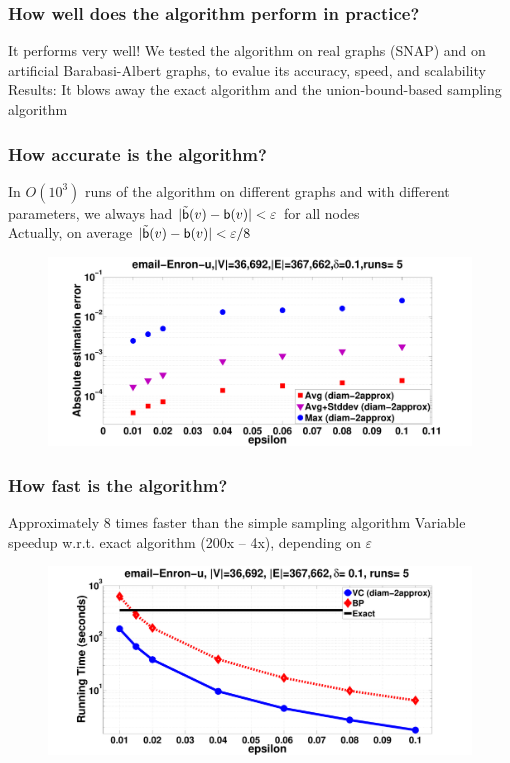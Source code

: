\begin{frame}
  \frametitle{How well does the algorithm perform in practice?}
  It performs very well!
  \vfill
  We tested the algorithm on real graphs (SNAP) and on artificial
  Barabasi-Albert graphs, to evalue its accuracy, speed, and scalability
  \vfill
  Results: It blows away the exact algorithm and the union-bound-based
  sampling algorithm
\end{frame}

\begin{frame}
  \frametitle{How accurate is the algorithm?}
  In $O(10^3)$ runs of the algorithm on different graphs and with different
  parameters, we always had $|\tilde{\mathsf{b}}(v)-\mathsf{b}(v)|<\varepsilon$ for all
  nodes\\
  \quad Actually, on average $|\tilde{\mathsf{b}}(v)-\mathsf{b}(v)|<\varepsilon/8$
  \vfill
  \begin{figure}[H]
    \centering
    \includegraphics[scale=0.22]{imgs/email-Enron-error.pdf}
  \end{figure}
\end{frame}

\begin{frame}
  \frametitle{How fast is the algorithm?}
  Approximately 8 times faster than the simple sampling algorithm
  \vfill
  Variable speedup w.r.t. exact algorithm (200x -- 4x), depending on
  $\varepsilon$
  \vfill
  \begin{figure}[H]
    \centering
    \includegraphics[scale=0.22]{imgs/email-Enron-time.pdf}
  \end{figure}
\end{frame}

